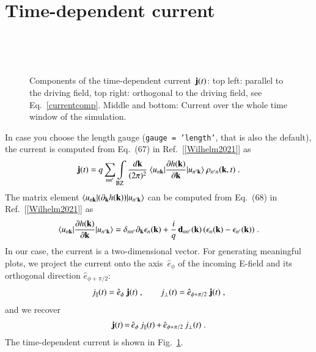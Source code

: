 \documentclass[11pt, a4paper]{scrartcl}
\newlength\figureheight
\newlength\figurewidth
\begin{document}
\section{Time-dependent current}
\begin{figure}
\centering
\setlength\figureheight{7.5cm} 
\setlength\figurewidth{7.5cm}
\hfill
\\
\setlength\figureheight{6.5cm} 
\setlength\figurewidth{\textwidth}

\\

\caption{Components of the time-dependent current~$\mathbf{j}(t)$: top left: parallel to the driving field, top right: orthogonal to the driving field, see Eq.~\eqref{currentcomp}.
Middle and bottom: Current over the whole time window of the simulation. }
    \label{fig:current}
\end{figure}
In case you choose the length gauge (\texttt{gauge = 'length'}, that is also the default), the current is computed from Eq.~(67) in Ref.~[\ref{Wilhelm2021}] as
\begin{align}
 \mathbf{j}(t)  =
q\sum_{nn'} \int\limits_\text{BZ}\frac{d\mathbf{k}}{(2\pi)^2}
\ \langle u_{n\mathbf{k}} |  \frac{\partial h(\mathbf{k})}{\partial \mathbf{k}} | u_{n'\mathbf{k}}\rangle \ \rho_{n'n}(\mathbf{k},t)\;.\label{current}
\end{align} 
The matrix element $ \langle u_{n\mathbf{k}} |  (\partial_{\mathbf{k}} h(\mathbf{k})) | u_{n'\mathbf{k}}\rangle$ can be computed from Eq.~(68) in Ref.~[\ref{Wilhelm2021}] as
\begin{align}
   \langle u_{n\mathbf{k}} |  \frac{\partial h(\mathbf{k})}{\partial \mathbf{k}} | u_{n'\mathbf{k}}\rangle  = \delta_{nn'}\partial_{\mathbf{k}}\epsilon_n(\mathbf{k}) 
   +\frac{i}{q}\, \mathbf{d}_{nn'}(\mathbf{k})\,(\epsilon_n(\mathbf{k})-\epsilon_{n'}(\mathbf{k})) \;.
\end{align}
%
In our case, the current is a two-dimensional vector. 
%
For generating meaningful plots, we project the current onto the axis~$\hat{e}_\phi$ of the incoming E-field and its orthogonal direction $\hat{e}_{\phi+\pi/2}$:
\begin{align}
    j_{\parallel}(t) = \hat{e}_\phi\;\mathbf{j}(t)\;,\hspace{2em}
    j_{\bot}(t) = \hat{e}_{\phi+\pi/2}\;\mathbf{j}(t)\;, 
    \label{currentcomp}
\end{align}
and we recover 
\begin{align}
\mathbf{j}(t)\,{=}\,\hat{e}_\phi\, j_{\parallel}(t)\,{+}\,\hat{e}_{\phi+\pi/2}\,j_{\bot}(t)\;.
    \label{currentdecomp}
\end{align}
The time-dependent current is shown in Fig.~\ref{fig:current}. 
\end{document}
